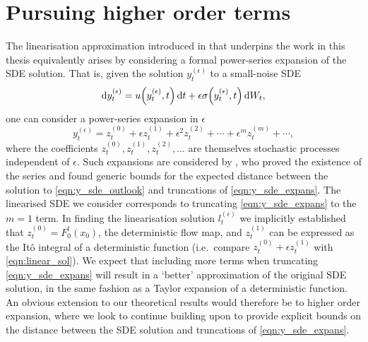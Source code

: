 \section{Pursuing higher order terms}\label{sec:disc_higher}
The linearisation approximation introduced in  that underpins the work in this thesis equivalently arises by considering a formal power-series expansion of the SDE solution.
That is, given the solution \(y_t^{(\epsilon)}\) to a small-noise SDE
\begin{equation}\label{eqn:y_sde_outlook}
	\dif y_t^{(\epsilon)} = u\!\left(y_t^{(\epsilon)}, t\right)\dif t + \epsilon \sigma\!\left(y_t^{(\epsilon)}, t\right)\dif W_t,
\end{equation}
one can consider a power-series expansion in \(\epsilon\)
\begin{equation}\label{eqn:y_sde_expans}
	y_t^{(\epsilon)} = z_t^{(0)} + \epsilon z_t^{(1)} + \epsilon^2 z_t^{(2)} + \dotsb + \epsilon^m z_t^{(m)} + \dotsb,
\end{equation}
where the coefficients \(z_t^{(0)}, z_t^{(1)}, z_t^{(2)}, \dotsc\) are themselves stochastic processes independent of \(\epsilon\).
Such expansions are considered by \citet{Blagoveshchenskii_1962_DiffusionProcessesDepending}, who proved the existence of the series and found generic bounds for the expected distance between the solution to \cref{eqn:y_sde_outlook} and truncations of \cref{eqn:y_sde_expans}.
The linearised SDE we consider corresponds to truncating \cref{eqn:y_sde_expans} to the \(m = 1\) term.
In finding the linearisation solution \(l_t^{(\epsilon)}\) we implicitly established that \(z_t^{(0)} = F_0^t\!\left(x_0\right)\), the deterministic flow map, and \(z_t^{(1)}\) can be expressed as the It\^o integral of a deterministic function (i.e.\ compare \(z_t^{(0)} + \epsilon z_t^{(1)}\) with \cref{eqn:linear_sol}).%
We expect that including more terms when truncating \cref{eqn:y_sde_expans} will result in a `better' approximation of the original SDE solution, in the same fashion as a Taylor expansion of a deterministic function.
An obvious extension to our theoretical results would therefore be to higher order expansion, where we look to continue building upon \citet{Blagoveshchenskii_1962_DiffusionProcessesDepending,FreidlinWentzell_1998_RandomPerturbationsDynamical} to provide explicit bounds on the distance between the SDE solution and truncations of \cref{eqn:y_sde_expans}.
